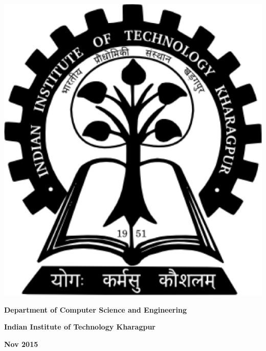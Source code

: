 \begin{center}
\includegraphics[scale=0.2]{iitlogo.pdf}
\end{center}
 \vspace{-1em}
\begin{center}
 \textbf{Department of Computer Science and Engineering}
\end{center}
 \vspace{-3em}
\begin{center}
 \textbf{Indian Institute of Technology Kharagpur} 
\end{center}
 \vspace{-3em}
\begin{center}
 \textbf{Nov 2015}
\end{center}
 \vspace{-3em}
\newpage
\thispagestyle{empty}
\cleardoublepage
